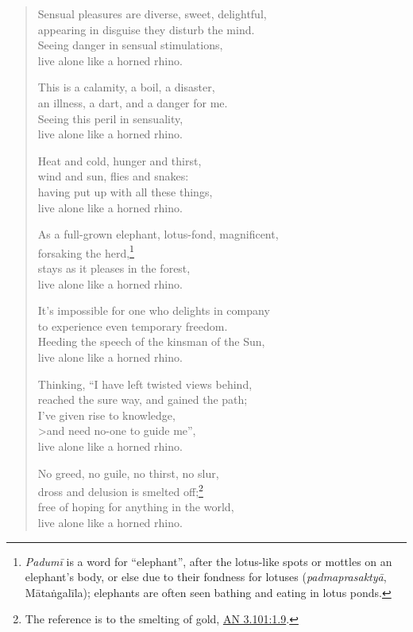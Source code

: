 \documentclass[12pt,openany]{book}%
\begin{document}
\begin{verse}
Sensual pleasures are diverse, sweet, delightful, \\
appearing in disguise they disturb the mind. \\
Seeing danger in sensual stimulations, \\
live alone like a horned rhino. 

This is a calamity, a boil, a disaster, \\
an illness, a dart, and a danger for me. \\
Seeing this peril in sensuality, \\
live alone like a horned rhino. 

Heat and cold, hunger and thirst, \\
wind and sun, flies and snakes: \\
having put up with all these things, \\
live alone like a horned rhino. 

As a full-grown elephant, lotus-fond, magnificent, \\
forsaking the herd,\footnote{\textit{\textsanskrit{Padumī}} is a word for “elephant”, after the lotus-like spots or mottles on an elephant’s body, or else due to their fondness for lotuses (\textit{\textsanskrit{padmaprasaktyā}}, \textsanskrit{Mātaṅgalīla}); elephants are often seen bathing and eating in lotus ponds. } \\
stays as it pleases in the forest, \\
live alone like a horned rhino. 

It’s impossible for one who delights in company \\
to experience even temporary freedom. \\
Heeding the speech of the kinsman of the Sun, \\
live alone like a horned rhino. 

Thinking, “I have left twisted views behind, \\
reached the sure way, and gained the path; \\
I’ve given rise to knowledge, \\>and need no-one to guide me”, \\
live alone like a horned rhino. 

No greed, no guile, no thirst, no slur, \\
dross and delusion is smelted off;\footnote{The reference is to the smelting of gold, \href{https://suttacentral.net/an3.101/en/sujato\#1.9}{AN 3.101:1.9}. } \\
free of hoping for anything in the world, \\
live alone like a horned rhino. 


\end{verse}
\end{document}
